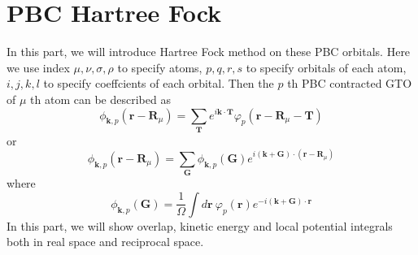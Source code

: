 \documentclass{article}
\begin{document}
\section{PBC Hartree Fock}
    In this part, we will introduce Hartree Fock method on these PBC orbitals.
    Here we use index $\mu,\nu,\sigma,\rho$ to specify atoms,
    $p,q,r,s$ to specify orbitals of each atom,
    $i,j,k,l$ to specify coeffcients of each orbital.
    Then the $p$ th PBC contracted GTO of $\mu$ th atom can be described as
    \begin{equation}
        \phi_{\textbf{k},p}(\textbf{r}-\textbf{R}_{\mu}) = \sum_{\textbf{T}}e^{i\textbf{k}\cdot\textbf{T}}\varphi_p(\textbf{r}-\textbf{R}_{\mu}-\textbf{T})
    \end{equation}
    or 
    \begin{equation}
        \phi_{\textbf{k},p}(\textbf{r}-\textbf{R}_{\mu}) = \sum_{\textbf{G}}\phi_{\textbf{k},p}(\textbf{G})e^{i(\textbf{k}+\textbf{G})\cdot(\textbf{r}-\textbf{R}_{\mu})}
    \end{equation}
    where
    \begin{equation}
        \phi_{\textbf{k},p}(\textbf{G}) = \frac{1}{\Omega}\int d\textbf{r}\ \varphi_p(\textbf{r})e^{-i(\textbf{k}+\textbf{G})\cdot\textbf{r}}
    \end{equation}
    In this part, we will show overlap, kinetic energy and local potential integrals both in real space and reciprocal space.

\end{document}
